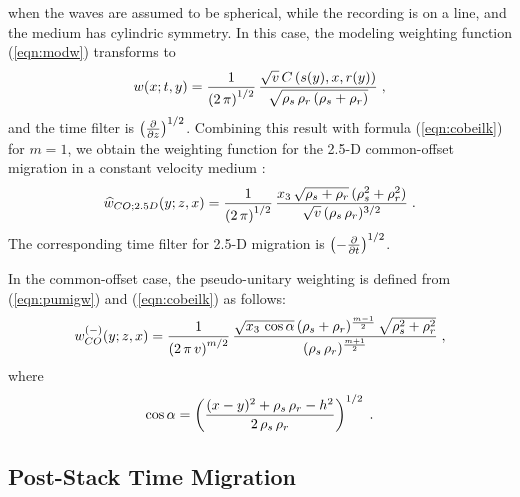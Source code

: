 when the waves are assumed to be spherical, while the recording is on a line,
and the medium has cylindric symmetry. In this case, the modeling weighting
function (\ref{eqn:modw}) transforms to
\cite[]{GPR31-02-02930333,GPR34-05-06860703}
\begin{equation}
w(x;t,y)  =  {1\over{\left(2\,\pi\right)^{1/2}}} \,
{\sqrt{v}\,{C\left(s(y),x,r(y)\right)} 
\over {\sqrt{\rho_s\,\rho_r\,(\rho_s + \rho_r)}}}\;,
\end{equation}
and the time filter is $\left({\partial \over {\partial
z}}\right)^{1/2}$. Combining this result with formula (\ref{eqn:cobeilk})
for $m=1$, we obtain the weighting function for the 2.5-D
common-offset migration in a constant velocity medium
\cite[]{GEO52-06-07450754}:
\begin{equation}
\widehat{w}_{CO;2.5D}(y;z,x)  =  {1\over{\left(2\,\pi\right)^{1/2}}} \,
{{x_3\,\sqrt{\rho_s + \rho_r}\,(\rho_s^2 + \rho_r^2)} \over 
{\sqrt{v}\,(\rho_s\,\rho_r)^{3/2}}}\;.
\end{equation}
The corresponding time filter for 2.5-D migration is $\left(-
{\partial \over {\partial t}}\right)^{1/2}$.
\par

In the
common-offset case, the pseudo-unitary weighting is defined from
(\ref{eqn:pumigw}) and (\ref{eqn:cobeilk}) as follows:
\begin{equation}
w^{(-)}_{CO}(y;z,x)  =  {1\over{\left(2\,\pi\,v\right)^{m/2}}} \,
{{\sqrt{x_3\,\cos{\alpha}}\,(\rho_s + \rho_r)^{{m-1} \over 2}\,
\sqrt{\rho_s^2 + \rho_r^2}} \over 
{(\rho_s\,\rho_r)^{{m+1} \over 2}}}\;,
\end{equation}
where
\begin{equation}
\cos{\alpha} = \left({
{(x - y)^2 + \rho_s\,\rho_r - h^2} \over {2\,\rho_s\,\rho_r}}
\right)^{1/2}\;.
\end{equation}

\subsection{Post-Stack Time Migration}

